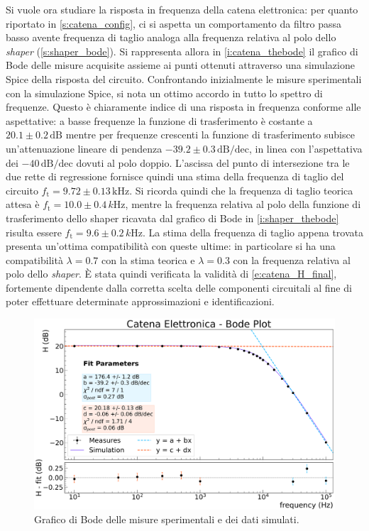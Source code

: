 \documentclass[a4paper,11pt]{article} %
\begin{document}
Si vuole ora studiare la risposta in frequenza della catena elettronica: per quanto riportato in
\autoref{s:catena_config}, ci si aspetta un comportamento da filtro passa basso avente frequenza di taglio analoga alla
frequenza relativa al polo dello \textit{shaper} (\autoref{s:shaper_bode}). Si rappresenta allora in
\autoref{i:catena_thebode} il grafico di Bode delle misure acquisite assieme ai punti ottenuti attraverso una
simulazione Spice della risposta del circuito. 
Confrontando inizialmente le misure sperimentali con la simulazione Spice, si nota un ottimo accordo in tutto lo spettro
di frequenze. Questo è chiaramente indice di una risposta in frequenza conforme alle aspettative: a basse frequenze la
funzione di trasferimento è costante a $20.1 \pm 0.2 \,\text{dB}$ mentre per frequenze crescenti la funzione di
trasferimento subisce un'attenuazione lineare di pendenza $-39.2\pm 0.3\,\text{dB/dec}$, in linea con l'aspettativa dei
$-40\,\text{dB/dec}$ dovuti al polo doppio. L'ascissa del punto di intersezione tra le due rette di regressione fornisce
quindi una stima della frequenza di taglio del circuito $f_{\text{t}}= 9.72 \pm 0.13 \,\si{\kilo\Hz}$. Si ricorda quindi
che la frequenza di taglio teorica attesa è $f_{\text{t}} = 10.0 \pm 0.4 \,\si{k\Hz}$, mentre la frequenza relativa al
polo della funzione di trasferimento dello shaper ricavata dal grafico di Bode in \autoref{i:shaper_thebode} risulta
essere $f_{\text{t}} = 9.6 \pm 0.2 \,\si{k\Hz}$. La stima della frequenza di taglio appena trovata presenta un'ottima
compatibilità con queste ultime: in particolare si ha una compatibilità $\lambda = 0.7$ con la stima teorica e $\lambda
= 0.3$ con la frequenza relativa al polo dello \textit{shaper}. È stata quindi verificata la validità di
\autoref{e:catena_H_final}, fortemente dipendente dalla corretta scelta delle componenti circuitali al fine di poter
effettuare determinate approssimazioni e identificazioni. 

\begin{figure}[H] 
	\centering
	\includegraphics[width=0.8\linewidth]{../Plots/Catena/bode_plot.png} 
	\vspace{-10pt}
	\caption{\small Grafico di Bode delle misure sperimentali e dei dati simulati.} 
	\label{i:catena_thebode} 
\end{figure} 
\end{document}
